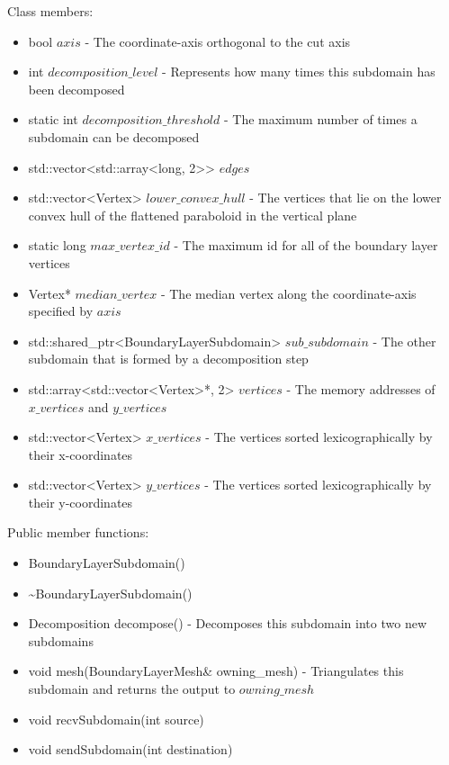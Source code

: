 \documentclass[manuscript, screen]{acmart}
\begin{document}
Class members:
\begin{itemize}
\item bool $axis$ - The coordinate-axis orthogonal to the cut axis
\item int $decomposition\_level$ - Represents how many times this subdomain has been decomposed
\item static int $decomposition\_threshold$ - The maximum number of times a subdomain can be decomposed
\item std::vector<std::array<long, 2>> $edges$
\item std::vector<Vertex> $lower\_convex\_hull$ - The vertices that lie on the lower convex hull of the flattened paraboloid in the vertical plane
\item static long $max\_vertex\_id$ - The maximum id for all of the boundary layer vertices
\item Vertex* $median\_vertex$ - The median vertex along the coordinate-axis specified by $axis$
\item std::shared\_ptr<BoundaryLayerSubdomain> $sub\_subdomain$ - The other subdomain that is formed by a decomposition step
\item std::array<std::vector<Vertex>*, 2> $vertices$ - The memory addresses of $x\_vertices$ and $y\_vertices$
\item std::vector<Vertex> $x\_vertices$ - The vertices sorted lexicographically by their x-coordinates
\item std::vector<Vertex> $y\_vertices$ - The vertices sorted lexicographically by their y-coordinates
\end{itemize}

Public member functions:
\begin{itemize}
\item BoundaryLayerSubdomain()

\item \textasciitilde{}BoundaryLayerSubdomain()
%

\item Decomposition decompose() - Decomposes this subdomain into two new subdomains

\item void mesh(BoundaryLayerMesh\& owning\_mesh) - Triangulates this subdomain and returns the output to $owning\_mesh$

\item void recvSubdomain(int source)

\item void sendSubdomain(int destination)
\end{itemize}
\end{document}
